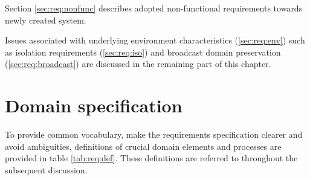 \documentclass[11pt,openany]{book}
\begin{document}
    Section \ref{sec:req:nonfunc} describes adopted non-functional requirements towards newly created system.

    Issues associated with underlying environment characteristics (\ref{sec:req:env}) such as isolation requirements
    (\ref{sec:req:iso}) and broadcast domain preservation (\ref{sec:req:broadcast}) are discussed in the remaining part
    of this chapter.


    \section{Domain specification}

      To provide common vocabulary, make the requirements specification clearer and avoid ambiguities, definitions of
      crucial domain elements and processes are provided in table \ref{tab:req:def}. These definitions are referred to
      throughout the subsequent discussion.
\end{document}
